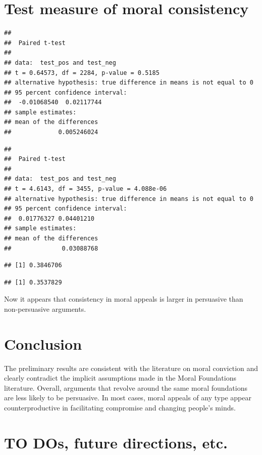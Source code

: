 \documentclass[12pt,]{article}
\begin{document}
\clearpage

\section{Test measure of moral
consistency}\label{test-measure-of-moral-consistency}

\begin{verbatim}
## 
##  Paired t-test
## 
## data:  test_pos and test_neg
## t = 0.64573, df = 2284, p-value = 0.5185
## alternative hypothesis: true difference in means is not equal to 0
## 95 percent confidence interval:
##  -0.01068540  0.02117744
## sample estimates:
## mean of the differences 
##             0.005246024
\end{verbatim}

\begin{verbatim}
## 
##  Paired t-test
## 
## data:  test_pos and test_neg
## t = 4.6143, df = 3455, p-value = 4.088e-06
## alternative hypothesis: true difference in means is not equal to 0
## 95 percent confidence interval:
##  0.01776327 0.04401210
## sample estimates:
## mean of the differences 
##              0.03088768
\end{verbatim}

\begin{verbatim}
## [1] 0.3846706
\end{verbatim}

\begin{verbatim}
## [1] 0.3537829
\end{verbatim}

Now it appears that consistency in moral appeals is larger in persuasive
than non-persuasive arguments.

\clearpage

\section{Conclusion}\label{conclusion}

The preliminary results are consistent with the literature on moral
conviction and clearly contradict the implicit assumptions made in the
Moral Foundations literature. Overall, arguments that revolve around the
same moral foundations are less likely to be persuasive. In most cases,
moral appeals of any type appear counterproductive in facilitating
compromise and changing people's minds.

\section{TO DOs, future directions,
etc.}\label{to-dos-future-directions-etc.}
\end{document}
